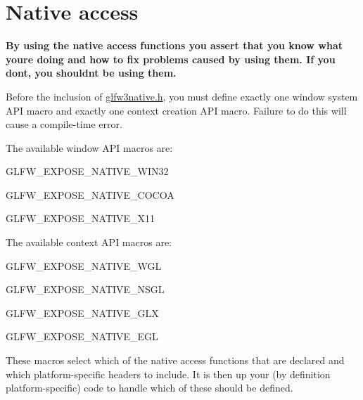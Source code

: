 \hypertarget{group__native}{}\section{Native access}
\label{group__native}
{\bfseries By using the native access functions you assert that you know what you\textquotesingle{}re doing and how to fix problems caused by using them. If you don\textquotesingle{}t, you shouldn\textquotesingle{}t be using them.}

Before the inclusion of \hyperlink{glfw3native_8h}{glfw3native.\+h}, you must define exactly one window system A\+P\+I macro and exactly one context creation A\+P\+I macro. Failure to do this will cause a compile-\/time error.

The available window A\+P\+I macros are\+:
\begin{DoxyItemize}
\item {\ttfamily G\+L\+F\+W\+\_\+\+E\+X\+P\+O\+S\+E\+\_\+\+N\+A\+T\+I\+V\+E\+\_\+\+W\+I\+N32}
\item {\ttfamily G\+L\+F\+W\+\_\+\+E\+X\+P\+O\+S\+E\+\_\+\+N\+A\+T\+I\+V\+E\+\_\+\+C\+O\+C\+O\+A}
\item {\ttfamily G\+L\+F\+W\+\_\+\+E\+X\+P\+O\+S\+E\+\_\+\+N\+A\+T\+I\+V\+E\+\_\+\+X11}
\end{DoxyItemize}

The available context A\+P\+I macros are\+:
\begin{DoxyItemize}
\item {\ttfamily G\+L\+F\+W\+\_\+\+E\+X\+P\+O\+S\+E\+\_\+\+N\+A\+T\+I\+V\+E\+\_\+\+W\+G\+L}
\item {\ttfamily G\+L\+F\+W\+\_\+\+E\+X\+P\+O\+S\+E\+\_\+\+N\+A\+T\+I\+V\+E\+\_\+\+N\+S\+G\+L}
\item {\ttfamily G\+L\+F\+W\+\_\+\+E\+X\+P\+O\+S\+E\+\_\+\+N\+A\+T\+I\+V\+E\+\_\+\+G\+L\+X}
\item {\ttfamily G\+L\+F\+W\+\_\+\+E\+X\+P\+O\+S\+E\+\_\+\+N\+A\+T\+I\+V\+E\+\_\+\+E\+G\+L}
\end{DoxyItemize}

These macros select which of the native access functions that are declared and which platform-\/specific headers to include. It is then up your (by definition platform-\/specific) code to handle which of these should be defined. 